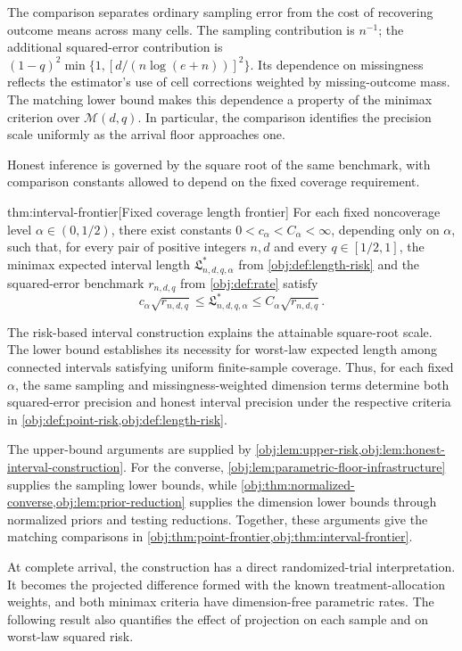 The comparison separates ordinary sampling error from the cost of recovering outcome means across many cells. The sampling contribution is \(n^{-1}\); the additional squared-error contribution is
\((1-q)^2\min\{1,[d/(n\log(e+n))]^2\}\).
Its dependence on missingness reflects the estimator's use of cell corrections weighted by missing-outcome mass. The matching lower bound makes this dependence a property of the minimax criterion over \(\mathcal M(d,q)\). In particular, the comparison identifies the precision scale uniformly as the arrival floor approaches one.

Honest inference is governed by the square root of the same benchmark, with comparison constants allowed to depend on the fixed coverage requirement.

\begin{theoremv}{thm:interval-frontier}[Fixed coverage length frontier]
For each fixed noncoverage level \(\alpha\in(0,1/2)\), there exist constants \(0<c_\alpha<C_\alpha<\infty\), depending only on \(\alpha\), such that, for every pair of positive integers \(n,d\) and every \(q\in[1/2,1]\), the minimax expected interval length \(\mathfrak L^*_{n,d,q,\alpha}\) from \cref{obj:def:length-risk} and the squared-error benchmark \(r_{n,d,q}\) from \cref{obj:def:rate} satisfy
\[
c_\alpha\sqrt{r_{n,d,q}}
\le \mathfrak L^*_{n,d,q,\alpha}
\le C_\alpha\sqrt{r_{n,d,q}}.
\]
\end{theoremv}

The risk-based interval construction explains the attainable square-root scale. The lower bound establishes its necessity for worst-law expected length among connected intervals satisfying uniform finite-sample coverage. Thus, for each fixed \(\alpha\), the same sampling and missingness-weighted dimension terms determine both squared-error precision and honest interval precision under the respective criteria in \cref{obj:def:point-risk,obj:def:length-risk}.

The upper-bound arguments are supplied by \cref{obj:lem:upper-risk,obj:lem:honest-interval-construction}. For the converse, \cref{obj:lem:parametric-floor-infrastructure} supplies the sampling lower bounds, while \cref{obj:thm:normalized-converse,obj:lem:prior-reduction} supplies the dimension lower bounds through normalized priors and testing reductions. Together, these arguments give the matching comparisons in \cref{obj:thm:point-frontier,obj:thm:interval-frontier}.

At complete arrival, the construction has a direct randomized-trial interpretation. It becomes the projected difference formed with the known treatment-allocation weights, and both minimax criteria have dimension-free parametric rates. The following result also quantifies the effect of projection on each sample and on worst-law squared risk.

